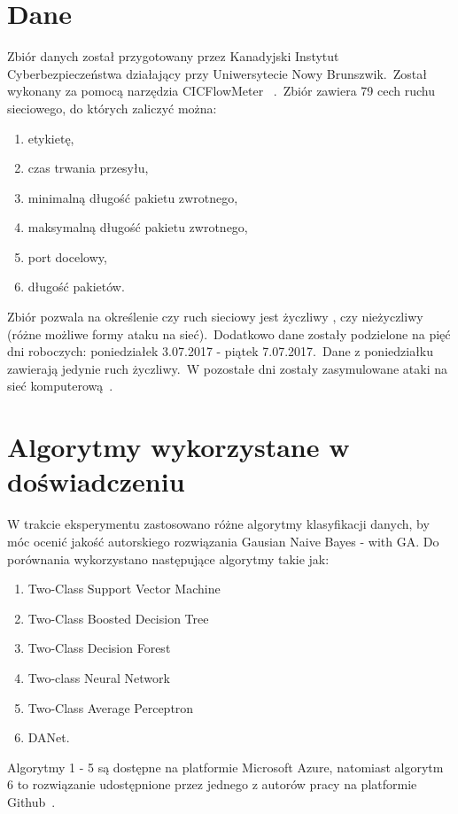 \section{Dane}
\label{sec:data}
Zbiór danych został przygotowany przez Kanadyjski Instytut Cyberbezpieczeństwa działający przy Uniwersytecie Nowy Brunszwik.\ Został wykonany za pomocą narzędzia CICFlowMeter
~\cite{Ahlashkari2022}.\ Zbiór zawiera 79 cech ruchu sieciowego, do których zaliczyć można:
\begin{enumerate}
    \item etykietę,
    \item czas trwania przesyłu,
    \item minimalną długość pakietu zwrotnego,
    \item maksymalną długość pakietu zwrotnego,
    \item port docelowy,
    \item długość pakietów.
\end{enumerate}
Zbiór pozwala na określenie czy ruch sieciowy jest życzliwy , czy nieżyczliwy (różne możliwe formy ataku na sieć).\ Dodatkowo dane zostały podzielone na pięć dni roboczych: poniedziałek 3.07.2017 - piątek 7.07.2017.\ Dane z poniedziałku zawierają jedynie ruch życzliwy.\ W pozostałe dni zostały zasymulowane ataki na sieć komputerową~\cite{Blyszcz2022, unbkaggle}.


\section{Algorytmy wykorzystane w doświadczeniu}
\label{sec:alg}
W trakcie eksperymentu zastosowano różne algorytmy klasyfikacji danych, by móc ocenić jakość autorskiego rozwiązania Gausian Naive Bayes - with GA. Do porównania wykorzystano następujące algorytmy takie jak:
\begin{enumerate}
    \item Two-Class Support Vector Machine
    \item Two-Class Boosted Decision Tree
    \item Two-Class Decision Forest
    \item Two-class Neural Network
    \item Two-Class Average Perceptron
    \item DANet.
\end{enumerate}
Algorytmy 1 - 5 są dostępne na platformie Microsoft Azure, natomiast algorytm 6 to rozwiązanie udostępnione przez jednego z autorów pracy na platformie Github~\cite{Danet}.

